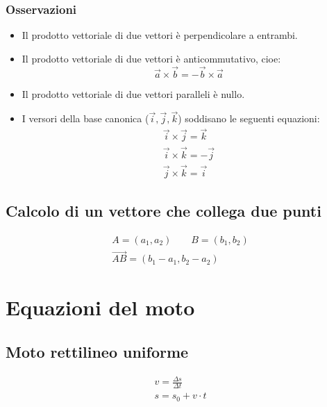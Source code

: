 \subsubsection{Osservazioni}
\begin{itemize}
\item{Il prodotto vettoriale di due vettori è perpendicolare a entrambi.}
\item{Il prodotto vettoriale di due vettori è anticommutativo, cioe:
   	\begin{displaymath}
       	\vec{a} \times \vec{b} = - \vec{b} \times \vec{a}
    \end{displaymath}}
\item{Il prodotto vettoriale di due vettori paralleli è nullo. } 
\item{I versori della base canonica ($\vec{i}, \vec{j}, \vec{k}$) soddisano le seguenti equazioni:
	\begin{displaymath}\begin{aligned}
		\vec{i} \times \vec{j} = \vec{k} \\
		\vec{i} \times \vec{k} = - \vec{j} \\
		\vec{j} \times \vec{k} = \vec{i}
	\end{aligned}\end{displaymath}}
\end{itemize}

\subsection{Calcolo di un vettore che collega due punti}
\begin{displaymath}\begin{aligned}
   	A = (a_1, a_2) \qquad B = (b_1, b_2)\\
    \vec{AB} = (b_1 - a_1, b_2 - a_2)
\end{aligned}\end{displaymath}

\section{Equazioni del moto}
\subsection{Moto rettilineo uniforme}
\begin{displaymath}\begin{aligned}
	v = \frac{\Delta s}{\Delta t}\\
    s = s_0 + v \cdot t\\
\end{aligned}\end{displaymath}
